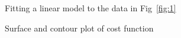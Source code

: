 \documentclass{article}
\begin{document}
\begin{figure}[h]
	\caption{Fitting a linear model to the data in Fig~\ref{fig:1}}\label{fig:2}
\end{figure}

\begin{figure}[h]
	\caption{Surface and contour plot of cost function}\label{fig:3}
\end{figure}
\end{document}
